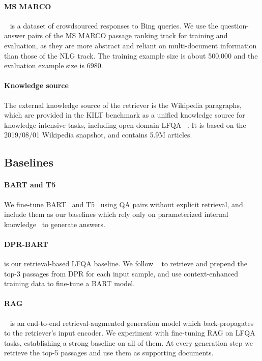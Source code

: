 \documentclass[11pt]{article}
\begin{document}
\paragraph{MS MARCO}~\cite{nguyen2016ms} is a dataset of crowdsourced responses to Bing
queries. We use the question-answer pairs of the MS MARCO passage ranking track for training and evaluation, as they are more abstract and reliant on multi-document information than those of the NLG track. The training example size is about 500,000 and the evaluation example size is 6980. 

\vspace{-5pt}
\paragraph{Knowledge source} The external knowledge source of the retriever is the Wikipedia paragraphs, which are provided in the KILT benchmark as a unified knowledge source for knowledge-intensive tasks, including open-domain LFQA ~\cite{petroni2021kilt}. It is based on the 2019/08/01 Wikipedia snapshot, and contains 5.9M articles. 


\vspace{-5pt}
\subsection{Baselines}
\label{sec:baselines}
\paragraph{BART and T5} We fine-tune BART~\cite{lewis2020bart} and T5~\cite{raffel2020exploring} using QA pairs without explicit retrieval, and include them as our baselines which rely only on parameterized internal knowledge~\cite{roberts2020much} to generate answers.
\vspace{-5pt}
\paragraph{DPR-BART} is our retrieval-based LFQA baseline. We follow ~\citet{petronicontext} to retrieve and prepend the top-3 passages from DPR for each input sample, and use context-enhanced training data to fine-tune a BART model.
\vspace{-5pt}
\paragraph{RAG} ~\cite{NEURIPS2020_6b493230} is an end-to-end retrieval-augmented generation model which back-propagates to the retriever’s input encoder. We experiment with fine-tuning RAG on LFQA tasks, establishing a strong baseline on all of them.  At every generation step we retrieve the top-5 passages and use them as supporting documents.
\vspace{-5pt}
\end{document}
